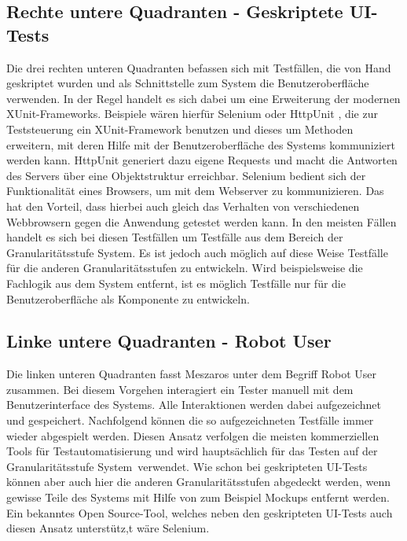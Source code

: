 \subsection{Rechte untere Quadranten - Geskriptete UI-Tests}
Die drei rechten unteren Quadranten befassen sich mit Testfällen, die von Hand geskriptet wurden und als Schnittstelle zum System die Benutzeroberfläche verwenden. In der Regel handelt es sich dabei um eine Erweiterung der modernen XUnit-Frameworks. Beispiele wären hierfür Selenium \cite{selenium_selenium_????} oder HttpUnit \cite{httpunit_httpunit_????}, die zur Teststeuerung ein XUnit-Framework benutzen und dieses um Methoden erweitern, mit deren Hilfe mit der Benutzeroberfläche des Systems kommuniziert werden kann. HttpUnit generiert dazu eigene Requests und macht die Antworten des Servers über eine Objektstruktur erreichbar. Selenium bedient sich der Funktionalität eines Browsers, um mit dem Webserver zu kommunizieren. Das hat den Vorteil, dass hierbei auch gleich das Verhalten von verschiedenen Webbrowsern gegen die Anwendung getestet werden kann. In den meisten Fällen handelt es sich bei diesen Testfällen um Testfälle aus dem Bereich der Granularitätsstufe \glqq System\grqq . Es ist jedoch auch möglich auf diese Weise Testfälle für die anderen Granularitätsstufen zu entwickeln. Wird beispielsweise die Fachlogik aus dem System entfernt, ist es möglich Testfälle nur für die Benutzeroberfläche als Komponente zu entwickeln.

\subsection{Linke untere Quadranten - Robot User}
Die linken unteren Quadranten fasst Meszaros unter dem Begriff \glqq Robot User\grqq\  \cite{meszaros_agile_2003} zusammen. Bei diesem Vorgehen interagiert ein Tester manuell mit dem Benutzerinterface des Systems. Alle Interaktionen werden dabei aufgezeichnet und gespeichert. Nachfolgend können die so aufgezeichneten Testfälle immer wieder abgespielt werden.
Diesen Ansatz verfolgen die meisten kommerziellen Tools für Testautomatisierung und wird hauptsächlich für das Testen auf der Granularitätsstufe \glqq System\grqq\ verwendet.
Wie schon bei geskripteten UI-Tests können aber auch hier die anderen Granularitätsstufen abgedeckt werden, wenn gewisse Teile des Systems mit Hilfe von zum Beispiel Mockups entfernt werden.
Ein bekanntes Open Source-Tool, welches neben den geskripteten UI-Tests auch diesen Ansatz unterstütz,t wäre Selenium.


